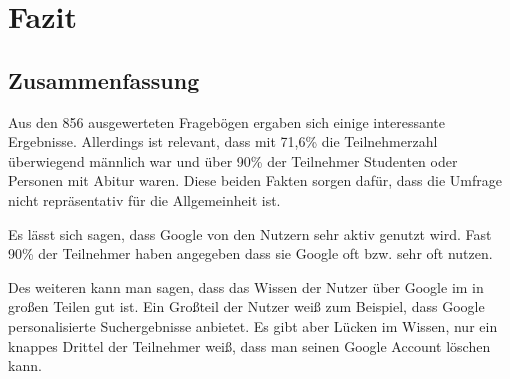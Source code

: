 %
% 

\chapter{Fazit}


\section{Zusammenfassung}
Aus den 856 ausgewerteten Fragebögen ergaben sich einige interessante Ergebnisse. Allerdings ist relevant, dass mit 71,6\% die Teilnehmerzahl überwiegend männlich war und über 90\% der Teilnehmer Studenten oder Personen mit Abitur waren. Diese beiden Fakten sorgen dafür, dass die Umfrage nicht repräsentativ für die Allgemeinheit ist.

Es lässt sich sagen, dass Google von den Nutzern sehr aktiv genutzt wird. Fast 90\% der Teilnehmer haben angegeben dass sie Google oft bzw. sehr oft nutzen.

Des weiteren kann man sagen, dass das Wissen der Nutzer über Google im in großen Teilen gut ist. Ein Großteil der Nutzer weiß zum Beispiel, dass Google personalisierte Suchergebnisse anbietet. Es gibt aber Lücken im Wissen, nur ein knappes Drittel der Teilnehmer weiß, dass man seinen Google Account löschen kann.


